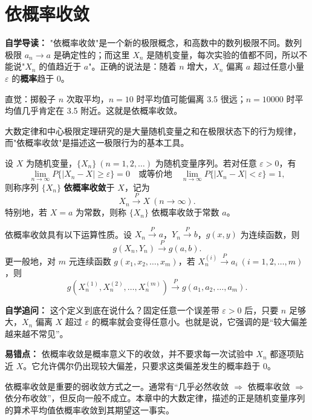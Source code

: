 ﻿\documentclass[lang=cn,11pt]{elegantbook}
\begin{document}
\section{依概率收敛}

\begin{note}
\textbf{自学导读：} "依概率收敛"是一个新的极限概念，和高数中的数列极限不同。数列极限 $a_n\to a$ 是确定性的；而这里 $X_n$ 是随机变量，每次实验的值都不同，所以不能说"$X_n$ 的值趋近于 $a$"。正确的说法是：随着 $n$ 增大，$X_n$ 偏离 $a$ 超过任意小量 $\varepsilon$ 的\textbf{概率}趋于 0。

直觉：掷骰子 $n$ 次取平均，$n=10$ 时平均值可能偏离 3.5 很远；$n=10000$ 时平均值几乎肯定在 3.5 附近。这就是依概率收敛。
\end{note}

大数定律和中心极限定理研究的是大量随机变量之和在极限状态下的行为规律，而"依概率收敛"是描述这一极限行为的基本工具。

\begin{definition}[依概率收敛] \label{def:convergence-prob}
设 \(X\) 为随机变量，\(\{X_n\}\ (n=1,2,\dots)\) 为随机变量序列。若对任意 \(\varepsilon > 0\)，有
\[
\lim_{n\to\infty} P\{|X_n - X| \geqslant \varepsilon\} = 0
\quad \text{或等价地} \quad
\lim_{n\to\infty} P\{|X_n - X| < \varepsilon\} = 1,
\]
则称序列 \(\{X_n\}\) \textbf{依概率收敛}于 \(X\)，记为
\[
X_n \stackrel{P}{\longrightarrow} X\ (n\to\infty).
\]
特别地，若 \(X = a\) 为常数，则称 \(\{X_n\}\) 依概率收敛于常数 \(a\)。
\end{definition}

\begin{property}[概率收敛运算性质]\label{prop:conv-prob-operation}
依概率收敛具有以下运算性质。设 \(X_n \stackrel{P}{\longrightarrow} a\)，\(Y_n \stackrel{P}{\longrightarrow} b\)，\(g(x,y)\) 为连续函数，则
\[
g(X_n, Y_n) \stackrel{P}{\longrightarrow} g(a, b).
\]
更一般地，对 \(m\) 元连续函数 \(g(x_1, x_2, \dots, x_m)\)，若 \(X_{n}^{(i)} \stackrel{P}{\longrightarrow} a_i\ (i=1,2,\dots,m)\)，则
\[
g\!\left(X_{n}^{(1)}, X_{n}^{(2)}, \dots, X_{n}^{(m)}\right) \stackrel{P}{\longrightarrow} g(a_1, a_2, \dots, a_m).
\]
\end{property}

\begin{note}
\textbf{自学追问：} 这个定义到底在说什么？固定任意一个误差带 \(\varepsilon>0\) 后，只要 \(n\) 足够大，\(X_n\) 偏离 \(X\) 超过 \(\varepsilon\) 的概率就会变得任意小。也就是说，它强调的是“较大偏差越来越不常见”。

\textbf{易错点：} 依概率收敛是概率意义下的收敛，并不要求每一次试验中 \(X_n\) 都逐项贴近 \(X\)。它允许偶尔仍出现较大偏差，只要求这类偏差发生的概率趋于 0。

依概率收敛是重要的弱收敛方式之一。通常有“几乎必然收敛 \(\Rightarrow\) 依概率收敛 \(\Rightarrow\) 依分布收敛”，但反向一般不成立。本章中的大数定律，描述的正是随机变量序列的算术平均值依概率收敛到其期望这一事实。
\end{note}
\end{document}
